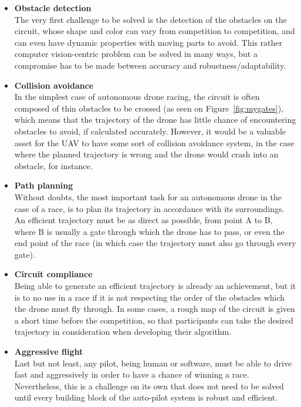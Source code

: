 \begin{itemize}
	\item{\textbf{Obstacle detection\\}
		The very first challenge to be solved is the detection of the obstacles
		on the circuit, whose shape and color can vary from competition to
		competition, and can even have dynamic properties with moving parts to
		avoid. This rather computer vision-centric problem can be solved
		in many ways, but a compromise has to be made between accuracy and
		robustness/adaptability.
	}
	\item{\textbf{Collision avoidance\\}
		In the simplest case of autonomous drone racing, the circuit is often
		composed of thin obstacles to be crossed (as seen on
		Figure~\ref{fig:mygates}), which means that the trajectory of the drone
		has little chance of encountering obstacles to avoid, if calculated
		accurately. However, it would be a valuable asset for the UAV to have
		some sort of collision avoidance system, in the case where the planned
		trajectory is wrong and the drone would crash into an obstacle, for
		instance.
	}
	\item{\textbf{Path planning\\}
		Without doubts, the most important task for an autonomous drone in the
		case of a race, is to plan its trajectory in accordance with its
		surroundings. An efficient trajectory must be as direct as possible,
		from point A to B, where B is usually a gate through which the drone
		has to pass, or even the end point of the race (in which case the
		trajectory must also go through every gate).
	}
	\item{\textbf{Circuit compliance\\}
		Being able to generate an efficient trajectory is already an
		achievement, but it is to no use in a race if it is not respecting the
		order of the obstacles which the drone must fly through. In some cases,
		a rough map of the circuit is given a short time before the
		competition, so that participants can take the desired trajectory in
		consideration when developing their algorithm.
	}
	\item{\textbf{Aggressive flight\\}
		Last but not least, any pilot, being human or software, must be able to
		drive fast and aggressively in order to have a chance of winning a
		race.  Nevertheless, this is a challenge on its own that does not need
		to be solved until every building block of the auto-pilot system is
		robust and efficient.\\
	}
\end{itemize}

